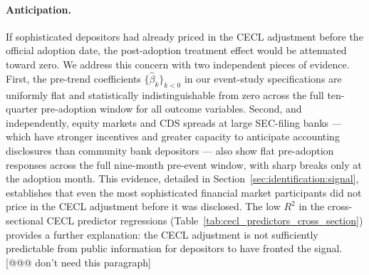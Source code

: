 \paragraph{Anticipation.}
If sophisticated depositors had already priced in the CECL adjustment before
the official adoption date, the post-adoption treatment effect would be
attenuated toward zero.  We address this concern with two independent pieces
of evidence.  First, the pre-trend coefficients $\{\hat{\beta}_k\}_{k < 0}$
in our event-study specifications are uniformly flat and statistically
indistinguishable from zero across the full ten-quarter pre-adoption window
for all outcome variables.  Second, and independently, equity markets and
CDS spreads at large SEC-filing banks --- which have stronger incentives and
greater capacity to anticipate accounting disclosures than community bank
depositors --- also show flat pre-adoption responses across the full nine-month
pre-event window, with sharp breaks only at the adoption month.  This evidence,
detailed in Section~\ref{sec:identification:signal}, establishes that even
the most sophisticated financial market participants did not price in the CECL
adjustment before it was disclosed.  The low $R^2$ in the cross-sectional
CECL predictor regressions (Table~\ref{tab:cecl_predictors_cross_section})
provides a further explanation: the CECL adjustment is not sufficiently
predictable from public information for depositors to have fronted the signal. [@@@ don't need this paragraph]

